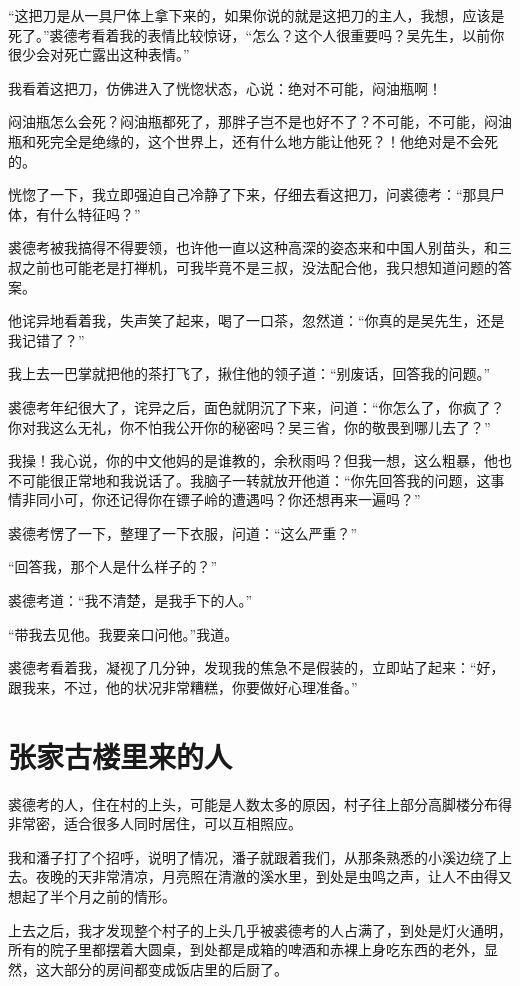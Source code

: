 “这把刀是从一具尸体上拿下来的，如果你说的就是这把刀的主人，我想，应该是死了。”裘德考看着我的表情比较惊讶，“怎么？这个人很重要吗？吴先生，以前你很少会对死亡露出这种表情。”

我看着这把刀，仿佛进入了恍惚状态，心说：绝对不可能，闷油瓶啊！

闷油瓶怎么会死？闷油瓶都死了，那胖子岂不是也好不了？不可能，不可能，闷油瓶和死完全是绝缘的，这个世界上，还有什么地方能让他死？！他绝对是不会死的。

恍惚了一下，我立即强迫自己冷静了下来，仔细去看这把刀，问裘德考：“那具尸体，有什么特征吗？”

裘德考被我搞得不得要领，也许他一直以这种高深的姿态来和中国人别苗头，和三叔之前也可能老是打禅机，可我毕竟不是三叔，没法配合他，我只想知道问题的答案。

他诧异地看着我，失声笑了起来，喝了一口茶，忽然道：“你真的是吴先生，还是我记错了？”

我上去一巴掌就把他的茶打飞了，揪住他的领子道：“别废话，回答我的问题。”

裘德考年纪很大了，诧异之后，面色就阴沉了下来，问道：“你怎么了，你疯了？你对我这么无礼，你不怕我公开你的秘密吗？吴三省，你的敬畏到哪儿去了？”

我操！我心说，你的中文他妈的是谁教的，余秋雨吗？但我一想，这么粗暴，他也不可能很正常地和我说话了。我脑子一转就放开他道：“你先回答我的问题，这事情非同小可，你还记得你在镖子岭的遭遇吗？你还想再来一遍吗？”

裘德考愣了一下，整理了一下衣服，问道：“这么严重？”

“回答我，那个人是什么样子的？”

裘德考道：“我不清楚，是我手下的人。”

“带我去见他。我要亲口问他。”我道。

裘德考看着我，凝视了几分钟，发现我的焦急不是假装的，立即站了起来：“好，跟我来，不过，他的状况非常糟糕，你要做好心理准备。”

\chapter{张家古楼里来的人}

裘德考的人，住在村的上头，可能是人数太多的原因，村子往上部分高脚楼分布得非常密，适合很多人同时居住，可以互相照应。

我和潘子打了个招呼，说明了情况，潘子就跟着我们，从那条熟悉的小溪边绕了上去。夜晚的天非常清凉，月亮照在清澈的溪水里，到处是虫鸣之声，让人不由得又想起了半个月之前的情形。

上去之后，我才发现整个村子的上头几乎被裘德考的人占满了，到处是灯火通明，所有的院子里都摆着大圆桌，到处都是成箱的啤酒和赤裸上身吃东西的老外，显然，这大部分的房间都变成饭店里的后厨了。

